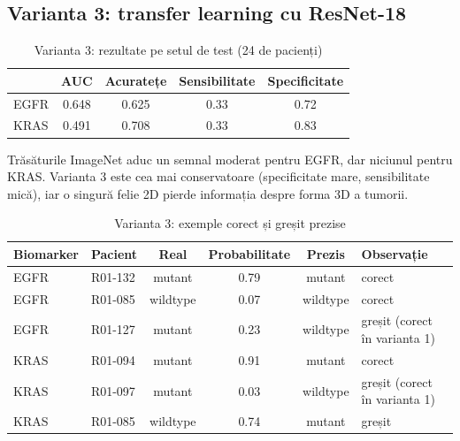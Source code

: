 \documentclass[runningheads,a4paper,11pt]{report}
\begin{document}
\subsection{Varianta 3: transfer learning cu ResNet-18}
\begin{table}[htbp]
    \centering
    \begin{tabular}{lcccc}
        \toprule
        & \textbf{AUC} & \textbf{Acuratețe} & \textbf{Sensibilitate} & \textbf{Specificitate} \\
        \midrule
        EGFR & 0.648 & 0.625 & 0.33 & 0.72 \\
        KRAS & 0.491 & 0.708 & 0.33 & 0.83 \\
        \bottomrule
    \end{tabular}
    \caption{Varianta 3: rezultate pe setul de test (24 de pacienți)}
    \label{tab:rez_v3}
\end{table}

Trăsăturile ImageNet aduc un semnal moderat pentru EGFR, dar niciunul pentru KRAS. Varianta 3 este cea mai conservatoare (specificitate mare, sensibilitate mică), iar o singură felie 2D pierde informația despre forma 3D a tumorii.

\begin{table}[htbp]
    \centering
    \begin{tabular}{llcccl}
        \toprule
        \textbf{Biomarker} & \textbf{Pacient} & \textbf{Real} & \textbf{Probabilitate} & \textbf{Prezis} & \textbf{Observație} \\
        \midrule
        EGFR & R01-132 & mutant & 0.79 & mutant & corect \\
        EGFR & R01-085 & wildtype & 0.07 & wildtype & corect \\
        EGFR & R01-127 & mutant & 0.23 & wildtype & greșit (corect în varianta 1) \\
        KRAS & R01-094 & mutant & 0.91 & mutant & corect \\
        KRAS & R01-097 & mutant & 0.03 & wildtype & greșit (corect în varianta 1) \\
        KRAS & R01-085 & wildtype & 0.74 & mutant & greșit \\
        \bottomrule
    \end{tabular}
    \caption{Varianta 3: exemple corect și greșit prezise}
    \label{tab:ex_v3}
\end{table}
\end{document}
